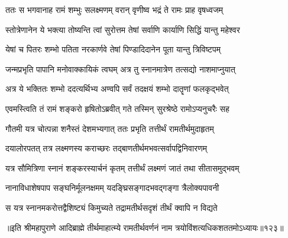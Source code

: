 

\twolineshloka
{ततः स भगवानाह रामं शम्भुः सलक्ष्मणम्}
{वरान् वृणीष्व भद्रं ते रामः प्राह वृषध्वजम्} %



\twolineshloka
{स्तोत्रेणानेन ये भक्त्या तोष्यन्ति त्वां सुरोत्तम}
{तेषां सर्वाणि कार्याणि सिद्धिं यान्तु महेश्वर} %

\twolineshloka
{येषां च पितरः शम्भो पतिता नरकार्णवे}
{तेषां पिण्डादिदानेन पूता यान्तु त्रिविष्टपम्} %

\twolineshloka
{जन्मप्रभृति पापानि मनोवाक्कायिकं त्वघम्}
{अत्र तु स्नानमात्रेण तत्सद्यो नाशमाप्नुयात्} %

\twolineshloka
{अत्र ये भक्तितः शम्भो ददत्यर्थिभ्य अण्वपि}
{सर्वं तदक्षयं शम्भो दातॄणां फलकृद्भवेत्} %



\twolineshloka
{एवमस्त्विति तं रामं शङ्करो हृषितोऽब्रवीत्}
{गते तस्मिन् सुरश्रेष्ठे रामोऽप्यनुचरैः सह} %

\twolineshloka
{गौतमी यत्र चोत्पन्ना शनैस्तं देशमभ्यगात्}
{ततः प्रभृति तत्तीर्थं रामतीर्थमुदाहृतम्} %

\twolineshloka
{दयालोरपतत् तत्र लक्ष्मणस्य कराच्छरः}
{तद्बाणतीर्थमभवत्सर्वापद्विनिवारणम्} %

\twolineshloka
{यत्र सौमित्रिणा स्नानं शङ्करस्यार्चनं कृतम्}
{तत्तीर्थं लक्ष्मणं जातं तथा सीतासमुद्भवम्} %

\twolineshloka
{नानाविधाशेषपाप सङ्घनिर्मूलनक्षमम्}
{यदङ्घ्रिसङ्गादभवद्गङ्गा त्रैलोक्यपावनी} %

\twolineshloka
{स यत्र स्नानमकरोत्तद्वैशिष्ट्यं किमुच्यते}
{तद्रामतीर्थसदृशं तीर्थं क्वापि न विद्यते} %

॥इति श्रीमहापुराणे आदिब्राह्मे तीर्थमाहात्म्ये रामतीर्थवर्णनं नाम त्रयोविंशत्यधिकशततमोऽध्यायः॥१२३॥
